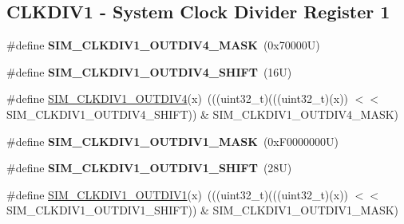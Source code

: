 \subsection*{C\+L\+K\+D\+I\+V1 -\/ System Clock Divider Register 1}
\begin{DoxyCompactItemize}
\item 
\mbox{\label{group___s_i_m___register___masks_gaa2a972171bb5a662e1b4993b042f7180}} 
\#define {\bfseries S\+I\+M\+\_\+\+C\+L\+K\+D\+I\+V1\+\_\+\+O\+U\+T\+D\+I\+V4\+\_\+\+M\+A\+SK}~(0x70000\+U)
\item 
\mbox{\label{group___s_i_m___register___masks_ga053a7a1ffc9f3b6834679c63ca0ebe29}} 
\#define {\bfseries S\+I\+M\+\_\+\+C\+L\+K\+D\+I\+V1\+\_\+\+O\+U\+T\+D\+I\+V4\+\_\+\+S\+H\+I\+FT}~(16\+U)
\item 
\#define \mbox{\hyperlink{group___s_i_m___register___masks_ga4e380b274f15fdde19e4fbd5c341a728}{S\+I\+M\+\_\+\+C\+L\+K\+D\+I\+V1\+\_\+\+O\+U\+T\+D\+I\+V4}}(x)~(((uint32\+\_\+t)(((uint32\+\_\+t)(x)) $<$$<$ S\+I\+M\+\_\+\+C\+L\+K\+D\+I\+V1\+\_\+\+O\+U\+T\+D\+I\+V4\+\_\+\+S\+H\+I\+FT)) \& S\+I\+M\+\_\+\+C\+L\+K\+D\+I\+V1\+\_\+\+O\+U\+T\+D\+I\+V4\+\_\+\+M\+A\+SK)
\item 
\mbox{\label{group___s_i_m___register___masks_ga1bd42e75000e91999a7d8c2f94a9b606}} 
\#define {\bfseries S\+I\+M\+\_\+\+C\+L\+K\+D\+I\+V1\+\_\+\+O\+U\+T\+D\+I\+V1\+\_\+\+M\+A\+SK}~(0x\+F0000000\+U)
\item 
\mbox{\label{group___s_i_m___register___masks_ga2d45b701595bf4f2bc6a451508f94c25}} 
\#define {\bfseries S\+I\+M\+\_\+\+C\+L\+K\+D\+I\+V1\+\_\+\+O\+U\+T\+D\+I\+V1\+\_\+\+S\+H\+I\+FT}~(28\+U)
\item 
\#define \mbox{\hyperlink{group___s_i_m___register___masks_ga288f4756a2240c6242f28335cc21a0a8}{S\+I\+M\+\_\+\+C\+L\+K\+D\+I\+V1\+\_\+\+O\+U\+T\+D\+I\+V1}}(x)~(((uint32\+\_\+t)(((uint32\+\_\+t)(x)) $<$$<$ S\+I\+M\+\_\+\+C\+L\+K\+D\+I\+V1\+\_\+\+O\+U\+T\+D\+I\+V1\+\_\+\+S\+H\+I\+FT)) \& S\+I\+M\+\_\+\+C\+L\+K\+D\+I\+V1\+\_\+\+O\+U\+T\+D\+I\+V1\+\_\+\+M\+A\+SK)
\end{DoxyCompactItemize}
